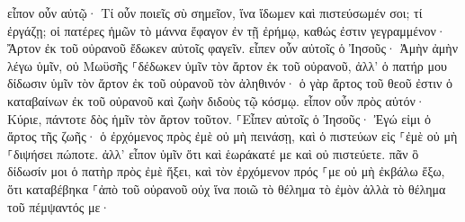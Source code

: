 \documentclass{openreader}
\begin{document}
εἶπον οὖν αὐτῷ· Τί οὖν ποιεῖς σὺ σημεῖον, ἵνα ἴδωμεν καὶ πιστεύσωμέν σοι; τί ἐργάζῃ; 
οἱ πατέρες ἡμῶν τὸ μάννα ἔφαγον ἐν τῇ ἐρήμῳ, καθώς ἐστιν γεγραμμένον· Ἄρτον ἐκ τοῦ οὐρανοῦ ἔδωκεν αὐτοῖς φαγεῖν. 
εἶπεν οὖν αὐτοῖς ὁ Ἰησοῦς· Ἀμὴν ἀμὴν λέγω ὑμῖν, οὐ Μωϋσῆς ⸀δέδωκεν ὑμῖν τὸν ἄρτον ἐκ τοῦ οὐρανοῦ, ἀλλ’ ὁ πατήρ μου δίδωσιν ὑμῖν τὸν ἄρτον ἐκ τοῦ οὐρανοῦ τὸν ἀληθινόν· 
ὁ γὰρ ἄρτος τοῦ θεοῦ ἐστιν ὁ καταβαίνων ἐκ τοῦ οὐρανοῦ καὶ ζωὴν διδοὺς τῷ κόσμῳ. 
εἶπον οὖν πρὸς αὐτόν· Κύριε, πάντοτε δὸς ἡμῖν τὸν ἄρτον τοῦτον. 
⸀Εἶπεν αὐτοῖς ὁ Ἰησοῦς· Ἐγώ εἰμι ὁ ἄρτος τῆς ζωῆς· ὁ ἐρχόμενος πρὸς ἐμὲ οὐ μὴ πεινάσῃ, καὶ ὁ πιστεύων εἰς ⸀ἐμὲ οὐ μὴ ⸀διψήσει πώποτε. 
ἀλλ’ εἶπον ὑμῖν ὅτι καὶ ἑωράκατέ με καὶ οὐ πιστεύετε. 
πᾶν ὃ δίδωσίν μοι ὁ πατὴρ πρὸς ἐμὲ ἥξει, καὶ τὸν ἐρχόμενον πρός ⸀με οὐ μὴ ἐκβάλω ἔξω, 
ὅτι καταβέβηκα ⸀ἀπὸ τοῦ οὐρανοῦ οὐχ ἵνα ποιῶ τὸ θέλημα τὸ ἐμὸν ἀλλὰ τὸ θέλημα τοῦ πέμψαντός με· 
\end{document}
